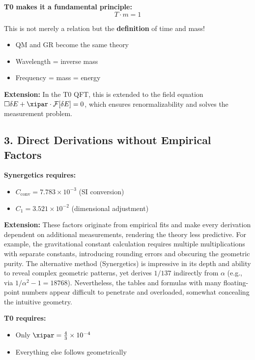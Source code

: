 	\begin{vorteil}
		\textbf{T0 makes it a fundamental principle:}
		\begin{equation}
			\boxed{T \cdot m = 1}
		\end{equation}
		
		This is not merely a relation but the \textbf{definition} of time and mass!
		\begin{itemize}
			\item QM and GR become the same theory
			\item Wavelength = inverse mass
			\item Frequency = mass = energy
		\end{itemize}
		
		\textbf{Extension:} In the T0 QFT, this is extended to the field equation $\square \delta E + \xipar \cdot \mathcal{F}[\delta E] = 0$, which ensures renormalizability and solves the measurement problem.
	\end{vorteil}
	
	\subsection{3. Direct Derivations without Empirical Factors}
	
	\textbf{Synergetics requires:}
	\begin{itemize}
		\item $C_{\text{conv}} = 7.783 \times 10^{-3}$ (SI conversion)
		\item $C_1 = 3.521 \times 10^{-2}$ (dimensional adjustment)
	\end{itemize}
	
	\textbf{Extension:} These factors originate from empirical fits and make every derivation dependent on additional measurements, rendering the theory less predictive. For example, the gravitational constant calculation requires multiple multiplications with separate constants, introducing rounding errors and obscuring the geometric purity. The alternative method (Synergetics) is impressive in its depth and ability to reveal complex geometric patterns, yet derives $1/137$ indirectly from $\alpha$ (e.g., via $1/\alpha^2 - 1 = 18768$). Nevertheless, the tables and formulas with many floating-point numbers appear difficult to penetrate and overloaded, somewhat concealing the intuitive geometry.
	
	\textbf{T0 requires:}
	\begin{itemize}
		\item Only $\xipar = \frac{4}{3} \times 10^{-4}$
		\item Everything else follows geometrically
	\end{itemize}
	
